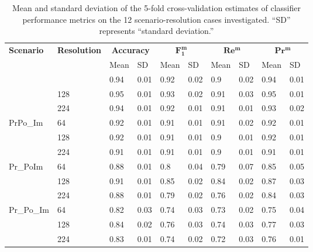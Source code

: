 \documentclass[Journal, letterpaper, DoubleSpace, InsideFigs]{ascelike-new}
\begin{document}
\begin{table}[ht]\small\centering
\caption{Mean and standard deviation of the 5-fold cross-validation estimates of classifier performance metrics on the 12 scenario-resolution cases investigated. ``SD'' represents ``standard deviation.''}
\label{tab:meanstd}
\begin{tabular}{llllllllll}\toprule
\multirow{3}{*}{\textbf{Scenario}} &  
\multirow{3}{*}{\textbf{Resolution}}  & \multicolumn{2}{c}{\textbf{Accuracy}} & \multicolumn{2}{c}{$\bm{F_1^m}$} 
& \multicolumn{2}{c}{$\bm{Re^m}$} & \multicolumn{2}{c}{$\bm{Pr^m}$} \\%
                          &            & Mean & SD  & Mean & SD  & Mean & SD  & Mean & SD  \\\midrule
\multirow{3}{*}{Pr\_Im}    & 64        & 0.94 & 0.01 & 0.92 & 0.02 & 0.9  & 0.02 & 0.94 & 0.01 \\
                          & 128        & 0.95 & 0.01 & 0.93 & 0.02 & 0.91 & 0.03 & 0.95 & 0.01 \\
                          & 224        & 0.94 & 0.01 & 0.92 & 0.01 & 0.91 & 0.01 & 0.93 & 0.02 \\\midrule
\multirow{3}{*}{PrPo\_Im}  & 64         & 0.92 & 0.01 & 0.91 & 0.01 & 0.91 & 0.02 & 0.92 & 0.01 \\
                          & 128        & 0.92 & 0.01 & 0.91 & 0.01 & 0.9  & 0.01 & 0.92 & 0.01 \\
                          & 224        & 0.91 & 0.01 & 0.91 & 0.01 & 0.9  & 0.01 & 0.91 & 0.01 \\\midrule
\multirow{3}{*}{Pr\_PoIm}  & 64         & 0.88 & 0.01 & 0.8  & 0.04 & 0.79 & 0.07 & 0.85 & 0.05 \\
                          & 128        & 0.91 & 0.01 & 0.85 & 0.02 & 0.84 & 0.02 & 0.87 & 0.03 \\
                          & 224        & 0.88 & 0.01 & 0.79 & 0.02 & 0.76 & 0.02 & 0.84 & 0.03 \\\midrule
\multirow{3}{*}{Pr\_Po\_Im} & 64         & 0.82 & 0.03 & 0.74 & 0.03 & 0.73 & 0.02 & 0.75 & 0.04 \\
                          & 128        & 0.84 & 0.02 & 0.76 & 0.03 & 0.74 & 0.03 & 0.77 & 0.03 \\
                          & 224        & 0.83 & 0.01 & 0.74 & 0.02 & 0.72 & 0.03 & 0.76 & 0.01\\ \bottomrule
\end{tabular}
\end{table}
\end{document}
